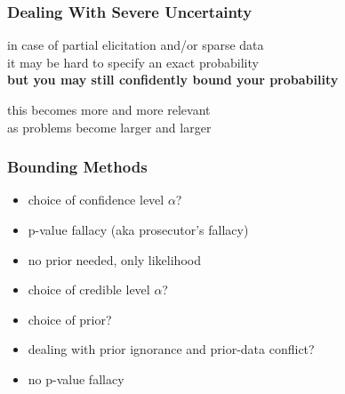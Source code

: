 \documentclass{beamer}
\newcommand{\gplus}{\structure{\textbf{+}}}
\newcommand{\gmins}{\structure{\textbf{--}}}
\begin{document}
\begin{frame}
  \frametitle{Dealing With Severe Uncertainty}
  \begin{alertblock}{}
    in case of \alert{partial elicitation} and/or \alert{sparse data}
    \\
    it may be hard to specify an exact probability
    \\
    \textbf{but you may still confidently bound your probability}
  \end{alertblock}
  \vspace{2em}
  this becomes more and more relevant \\
  as problems become larger and larger
\end{frame}

\begin{frame}
  \frametitle{Bounding Methods} %
    \begin{itemize}
  \setlength{\itemsep}{0pt}
  \setlength{\parskip}{0pt}
  \setlength{\parsep}{0pt}
    \item[\gmins] choice of confidence level $\alpha$?
    \item[\gmins] p-value fallacy (aka prosecutor's fallacy)
    \item[\gplus] no prior needed, only likelihood
    \end{itemize}
  \vspace*{1ex}
      \begin{itemize}
  \setlength{\itemsep}{0pt}
  \setlength{\parskip}{0pt}
  \setlength{\parsep}{0pt}
      \item[\gmins] choice of credible level $\alpha$?
      \item[\gmins] choice of prior?
      \item[\gmins] dealing with prior ignorance and prior-data conflict?
      \item[\gplus] no p-value fallacy
      \end{itemize}

\end{frame}
\end{document}
